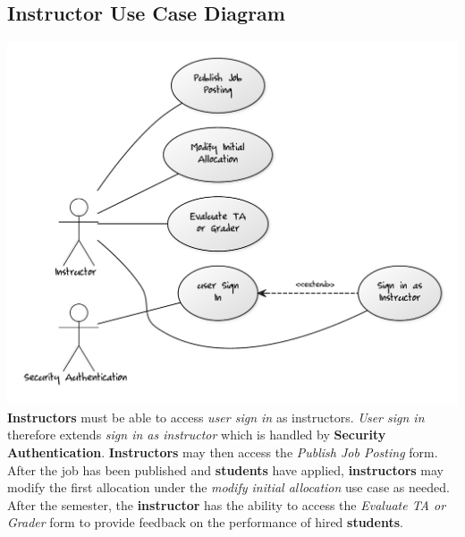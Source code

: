 \documentclass[12pt,openany]{report}
\begin{document}
\subsection{Instructor Use Case Diagram}
\includegraphics[scale=0.5]{model/Diagrams/UC/instructorUC}
\\
\textbf{Instructors} must be able to access \textit{user sign in} as instructors. \textit{User sign in}
therefore extends \textit{sign in as instructor} which is handled by \textbf{Security
Authentication}. \textbf{Instructors} may then access the \textit{Publish Job Posting} form. After
the job has been published and \textbf{students} have applied, \textbf{instructors} may modify the
first allocation under the \textit{modify initial allocation} use case as needed. After the
semester, the \textbf{instructor} has the ability to access the \textit{Evaluate TA or Grader} form
to provide feedback on the performance of hired \textbf{students}.
\end{document}
